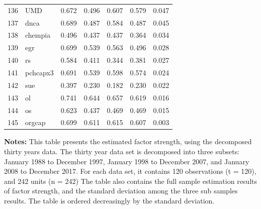 \begin{footnotesize}
\begin{longtable}{rl|c|c|c|c|c}
		136 & UMD & 0.672 & 0.496 & 0.607 & 0.579 & 0.047 \\ 
		137 & dnca & 0.689 & 0.487 & 0.584 & 0.487 & 0.045 \\ 
		138 & chempia & 0.496 & 0.437 & 0.437 & 0.364 & 0.034 \\ 
		139 & egr & 0.699 & 0.539 & 0.563 & 0.496 & 0.028 \\ 
		140 & rs & 0.584 & 0.411 & 0.344 & 0.381 & 0.027 \\ 
		141 & pchcapx3 & 0.691 & 0.539 & 0.598 & 0.574 & 0.024 \\ 
		142 & sue & 0.397 & 0.230 & 0.182 & 0.230 & 0.022 \\ 
		143 & ol & 0.741 & 0.644 & 0.657 & 0.619 & 0.016 \\ 
		144 & os & 0.623 & 0.437 & 0.469 & 0.469 & 0.015 \\ 
		145 & orgcap & 0.699 & 0.611 & 0.615 & 0.607 & 0.003 \\ 
		\hline
	\end{longtable}
			\begin{minipage}{\textwidth}
	{\footnotesize {\bf Notes:}	This table presents the estimated factor strength, using the decomposed thirty years data.
	The thirty year data set is decomposed into three subsets: January 1988 to December 1997, January 1998 to December 2007, and January 2008 to December 2017. For each data set, it contains 120 observations (t = 120), and 242 units (n = 242)
The table also contains the full sample estimation results of factor strength, and the standard deviation among the three sub samples results.
The table is ordered decreasingly by the standard deviation.}
\end{minipage}
\end{footnotesize}

